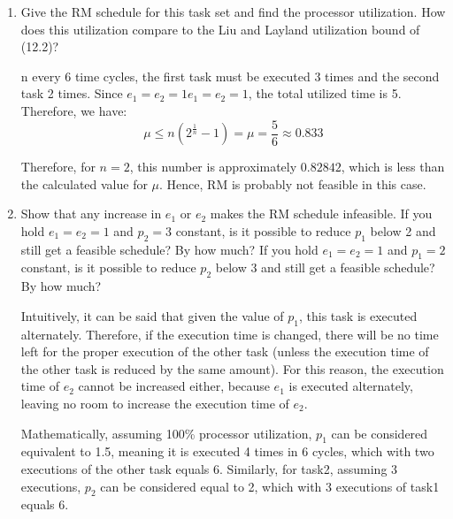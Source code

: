\documentclass[12pt]{article}
\begin{document}
\begin{enumerate}
	\item 
	Give the RM schedule for this task set and find the processor utilization.
	How does this utilization compare to the Liu and Layland utilization bound of
	(12.2)?
	\begin{qsolve}
		n every 6 time cycles, the first task must be executed 3 times and the second task 2 times.
		Since $e_1=e_2=1e_1=e_2=1$, the total utilized time is 5.
		Therefore, we have:
		$$ \mu\le n(2^{\frac{1}{n}}-1)=\mu = \frac{5}{6}\approx 0.833 $$
		
		Therefore, for $n=2$, this number is approximately $0.82842$, which is less than the calculated value for $\mu$. Hence, RM is probably not feasible in this case.
	\end{qsolve}
	
	
	\item 
	Show that any increase in $e_1$ or $e_2$ makes the RM schedule infeasible. If you
	hold $e_1 = e_2 = 1$ and $p_2 = 3$ constant, is it possible to reduce $p_1$ below 2
	and still get a feasible schedule? By how much? If you hold $e_1 = e_2 = 1$
	and $p_1 = 2$ constant, is it possible to reduce $p_2$ below 3 and still get a feasible
	schedule? By how much?
	\begin{qsolve}
		Intuitively, it can be said that given the value of $p_1$, this task is executed alternately. Therefore, if the execution time is changed, there will be no time left for the proper execution of the other task (unless the execution time of the other task is reduced by the same amount). For this reason, the execution time of $e_2$ cannot be increased either, because $e_1$ is executed alternately, leaving no room to increase the execution time of $e_2$.
		
		Mathematically, assuming 100\% processor utilization, $p_1$ can be considered equivalent to 1.5, meaning it is executed 4 times in 6 cycles, which with two executions of the other task equals 6. Similarly, for task2, assuming 3 executions, $p_2$ can be considered equal to 2, which with 3 executions of task1 equals 6.
	\end{qsolve}
	
	
	

\end{enumerate}
\end{document}
